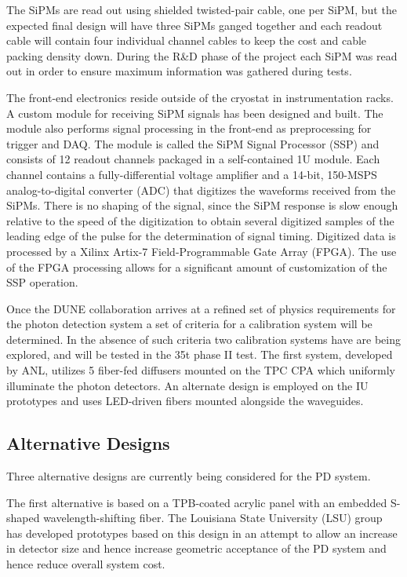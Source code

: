 The SiPMs are read out using shielded twisted-pair cable, one per SiPM,
but the expected final design will have three SiPMs ganged together and
each readout cable will contain four individual channel cables to keep
the cost and cable packing density down. During the R\&D phase of the
project each SiPM was read out in order to ensure maximum information
was gathered during tests.  

The front-end electronics reside outside of the cryostat in
instrumentation racks. A custom module for receiving SiPM signals has
been designed and built. The module also performs signal processing in
the front-end as preprocessing for trigger and DAQ.  The module is
called the SiPM Signal Processor (SSP) and consists of 12 readout
channels packaged in a self-contained 1U module.  Each channel
contains a fully-differential voltage amplifier and a 14-bit, 150-MSPS
analog-to-digital converter (ADC) that digitizes the waveforms
received from the SiPMs. There is no shaping of the signal, since the
SiPM response is slow enough relative to the speed of the digitization
to obtain several digitized samples of the leading edge of the pulse
for the determination of signal timing. Digitized data is processed by
a Xilinx Artix-7 Field-Programmable Gate Array (FPGA).  The use of the
FPGA processing allows for a significant amount of customization of
the SSP operation. 

Once the DUNE collaboration arrives at a refined set of physics
requirements for the photon detection system a set of criteria for a
calibration system will be determined. In the absence of such criteria
two calibration systems have are being explored, and will be tested in
the 35t phase II test. The first system, developed by ANL, utilizes 5
fiber-fed diffusers mounted on the TPC CPA which uniformly illuminate
the photon detectors. An alternate design is employed on the IU
prototypes and uses LED-driven fibers mounted alongside the
waveguides. 

\subsection{Alternative Designs} 

Three alternative designs are currently being considered for the PD
system.

The first alternative is based on a TPB-coated acrylic panel with an
embedded S-shaped wavelength-shifting fiber. The Louisiana State
University (LSU) group has developed prototypes based on this design
in an attempt to allow an increase in detector size and hence increase
geometric acceptance of the PD system and hence reduce overall system
cost.

